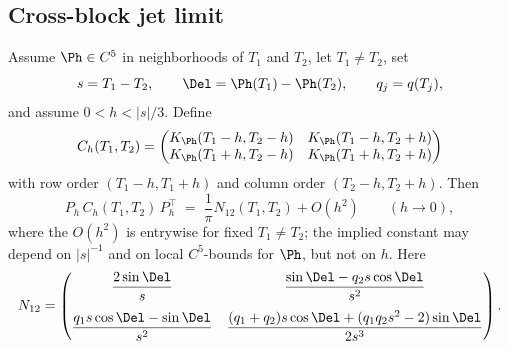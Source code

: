\subsection{Cross-block jet limit}
\label{subsec:cross-block-jet-limit}

\begin{lemma}
\label{lem:cross-block-jet-limit}
Assume \(\Ph\in C^5\) in neighborhoods of \(T_1\) and \(T_2\), let
\(T_1\ne T_2\), set
\[
        s = T_1 - T_2,
        \qquad \Del = \Ph(T_1)-\Ph(T_2),
        \qquad q_j = q(T_j),
\]
and assume \(0 < h < |s|/3\).  Define
\[
C_h(T_1, T_2)=
\begin{pmatrix}
K_\Ph(T_1-h, T_2-h) & K_\Ph(T_1-h, T_2+h)\\
K_\Ph(T_1+h, T_2-h) & K_\Ph(T_1+h, T_2+h)
\end{pmatrix}
\]
with row order \((T_1-h, T_1+h)\) and column order \((T_2-h, T_2+h)\).
Then
\[
        P_h\,C_h(T_1, T_2)\,P_h^\top
        \;=\; \frac1\pi N_{12}(T_1, T_2) + O(h^2)
        \qquad (h\to 0),
\]
where the \(O(h^2)\) is entrywise for fixed \(T_1\ne T_2\); the implied
constant may depend on \(|s|^{-1}\) and on local \(C^5\)-bounds for
\(\Ph\), but not on \(h\).  Here
\begin{equation}
\label{eq:cross-N12}
N_{12}=
\begin{pmatrix}
\dfrac{2\sin\Del}{s}
&
\dfrac{\sin\Del - q_2 s\cos\Del}{s^2}
\\[2.4ex]
\dfrac{q_1 s\cos\Del - \sin\Del}{s^2}
&
\dfrac{(q_1+q_2)s\cos\Del + (q_1 q_2 s^2 - 2)\sin\Del}{2s^3}
\end{pmatrix}.
\end{equation}
\end{lemma}

